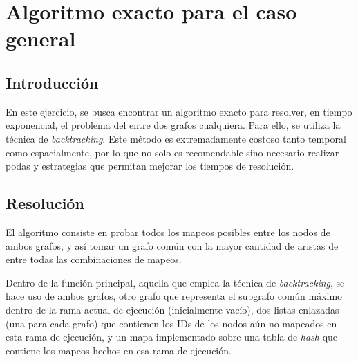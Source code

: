 \section{Algoritmo exacto para el caso general}


\subsection{Introducción}
En este ejercicio, se busca encontrar un algoritmo exacto para resolver, en
tiempo exponencial, el problema del  entre dos grafos cualquiera.
Para ello, se utiliza la técnica de \textit{backtracking}. Este método es
extremadamente costoso tanto temporal como espacialmente, por lo que no solo
es recomendable sino necesario realizar podas y estrategias que
permitan mejorar los tiempos de resolución.

\subsection{Resolución}
El algoritmo consiste en probar todos los mapeos posibles entre los nodos de
ambos grafos, y así tomar un grafo común con la mayor cantidad de aristas de
entre todas las combinaciones de mapeos.

Dentro de la función principal, aquella que emplea la técnica de
\textit{backtracking}, se hace uso de ambos grafos, otro grafo que representa
el subgrafo común máximo dentro de la rama actual de ejecución (inicialmente
vacío), dos listas enlazadas (una para cada grafo) que contienen
los IDs de los nodos aún no mapeados en esta rama de ejecución, y un mapa
implementado sobre una tabla de \emph{hash} que contiene los mapeos hechos en esa
rama de ejecución.

\vspace{1em}

